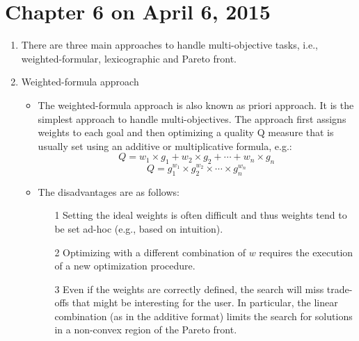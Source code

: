 \documentclass[12pt, a4paper]{article}
\begin{document}
\section{Chapter 6 on April 6, 2015}

\begin{enumerate}
 \item There are three main approaches to handle multi-objective tasks, i.e., weighted-formular, lexicographic and Pareto front.
 
 \item Weighted-formula approach
  \begin{itemize}
   \item The weighted-formula approach is also known as priori approach. It is the simplest approach to handle multi-objectives. The approach first assigns weights to each goal and then optimizing a quality Q measure that is usually set using an additive or multiplicative formula, e.g.:
   $$Q=w_1 \times g_1 + w_2 \times g_2 + \cdots + w_n \times g_n$$
   $$Q=g_1^{w_1} \times g_2^{w_2} \times \cdots \times g_n^{w_n}$$   
   \item The disadvantages are as follows:
    \begin{itemize}
     \item[1] Setting the ideal weights is often difficult and thus weights tend to be set ad-hoc (e.g., based on intuition). 
     \item[2] Optimizing with a different combination of $w$ requires the execution of a new optimization procedure.
     \item[3] Even if the weights are correctly defined, the search will miss trade-offs that might be interesting for the user. In particular, the linear combination (as in the additive format) limits the search for solutions in a non-convex region of the Pareto front. 
     
    \end{itemize}
  \end{itemize}
 

\end{enumerate}
\end{document}
